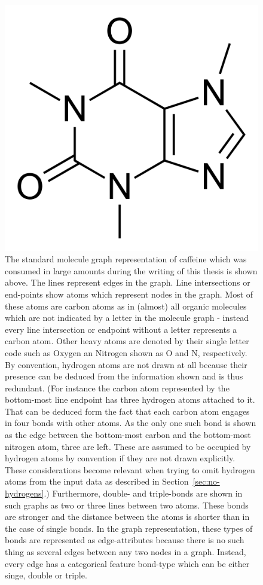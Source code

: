 \begin{figure}[H]
	\centering
	\includegraphics[width=0.7\linewidth]{figures/caffeine}
	\caption{The standard molecule graph representation of caffeine which was consumed in large amounts during the writing of this thesis is shown above. The lines represent edges in the graph. Line intersections or end-points show atoms which represent nodes in the graph. Most of these atoms are carbon atoms as in (almost) all organic molecules which are not indicated by a letter in the molecule graph - instead every line intersection or endpoint without a letter represents a carbon atom. Other heavy atoms are denoted by their single letter code such as Oxygen an Nitrogen shown as O and N, respectively.
	By convention, hydrogen atoms are not drawn at all because their presence can be deduced from the information shown and is thus redundant. (For instance the carbon atom represented by the bottom-most line endpoint has three hydrogen atoms attached to it. That can be deduced form the fact that each carbon atom engages in four bonds with other atoms. As the only one such bond is shown as the edge between the bottom-most carbon and the bottom-most nitrogen atom, three are left. These are assumed to be occupied by hydrogen atoms by convention if they are not drawn explicitly. These considerations become relevant when trying to omit hydrogen atoms from the input data as described in Section~\ref{sec:no-hydrogens}.)
	Furthermore, double- and triple-bonds are shown in such graphs as two or three lines between two atoms. These bonds are stronger and the distance between the atoms is shorter than in the case of single bonds. In the graph representation, these types of bonds are represented as edge-attributes because there is no such thing as several edges between any two nodes in a graph. Instead, every edge has a categorical feature bond-type which can be either singe, double or triple.
	}
	\label{fig:caffeine}
\end{figure}


